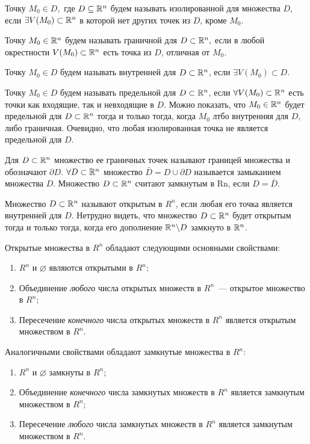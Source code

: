 \documentclass[../../main.tex]{subfiles}
\begin{document}
	Точку $M_0 \in D,$ где $D \subseteq \mathbb{R}^n$ будем называть изолированной для множества $D$, если $\exists V(M_0) \subset \mathbb{R}^n$ в которой нет других точек из $D$, кроме $M_0$.
	
	Точку $M_0 \in \mathbb{R}^n$ будем называть граничной для $D \subset \mathbb{R}^n,$ если в любой окрестности $V(M_0) \subset \mathbb{R}^n$ есть точка из $D$, отличная от $M_0$. 
	
	Точку $M_0 \in D$ будем называть внутренней для $D \subset \mathbb{R}^n$, если $\exists V(M_0) \subset D$.
	
	Точку $M_0 \in D$ будем называть предельной для $D \subset \mathbb{R}^n$, если $\forall V(M_0) \subset \mathbb{R}^n$ есть точки как входящие, так и невходящие в $D$.
	Можно показать, что $M_0 \in \mathbb{R}^n$ будет предельной для $D \subset \mathbb{R}^n$ тогда и только тогда, когда $M_0$ лтбо внутренняя для $D$, либо граничная.
	Очевидно, что любая изолированная точка не является предельной для $D$.
	
	Для $D \subset \mathbb{R}^n$ множество ее граничных точек называют границей множества  и обозначают $\partial D$. 
	$\forall D \subset \mathbb{R}^n$ множество $\bar D = D \cup \partial D$ называется замыканием множества $D$. 
	Множество $D \subset \mathbb{R}^n$ считают замкнутым в Rn, если  $D = \bar D$.
	
	Множество $D \subset \mathbb{R}^n$ называют открытым в $R^n$, если любая его точка является внутренней для $D$. Нетрудно видеть, что множество $D \subset \mathbb{R}^n$ будет открытым тогда и только тогда, когда его дополнение $\mathbb{R}^n \backslash D$ замкнуто в $\mathbb{R}^n$. 
	
	\smallskip
	Открытые множества в $R^n$ обладают следующими основными свойствами:
	\begin{enumerate}
		\item
	 	$R^n$  и $\varnothing$ являются открытыми в $R^n$; 
	 	\item
	 	 Объединение \emph{любого} числа открытых множеств в $R^n$~--- открытое множество в $R^n$; 
	 	 \item Пересечение \emph{конечного} числа открытых множеств в $R^n$ является открытым множеством в $R^n$.
	\end{enumerate}	

	Аналогичными свойствами обладают замкнутые множества в $R^n$:
	\begin{enumerate}
		\item  $R^n$  и $\varnothing$ замкнуты в $R^n$;
		\item Объединение \emph{конечного}  числа замкнутых множеств в $R^n$ является замкнутым множеством в $R^n$; 
		\item Пересечение \emph{любого} числа замкнутых множеств в $R^n$ является замкнутым множеством в $R^n$.
	\end{enumerate} 
	
\end{document}

